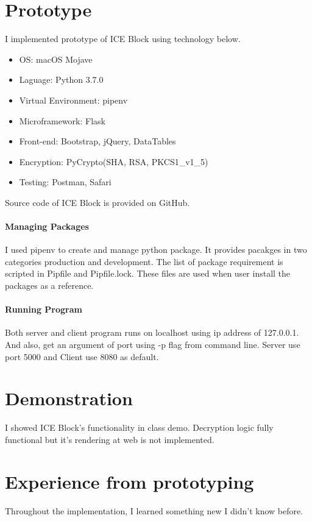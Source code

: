 \documentclass[conference]{IEEEtran}
\begin{document}
\section{Prototype}
I implemented prototype of ICE Block using technology below.

\begin{itemize}
    \item OS: macOS Mojave
    \item Laguage: Python 3.7.0
    \item Virtual Environment: pipenv
    \item Microframework: Flask
    \item Front-end: Bootstrap, jQuery, DataTables
    \item Encryption: PyCrypto(SHA, RSA, PKCS1\_v1\_5)
    \item Testing: Postman, Safari
\end{itemize}

Source code of ICE Block is provided on GitHub.\cite{r3}

\paragraph{Managing Packages}
I used pipenv to create and manage python package.
It provides pacakges in two categories production and development.
The list of package requirement is scripted in Pipfile and Pipfile.lock.
These files are used when user install the packages as a reference.  

\paragraph{Running Program}
Both server and client program runs on localhost using ip address of 127.0.0.1.
And also, get an argument of port using -p flag from command line.
Server use port 5000 and Client use 8080 as default.


\section{Demonstration}
I showed ICE Block's functionality in class demo.
Decryption logic fully functional but it's rendering at web is not implemented.


\section{Experience from prototyping}
Throughout the implementation, I learned something new I didn't know before.
\end{document}
